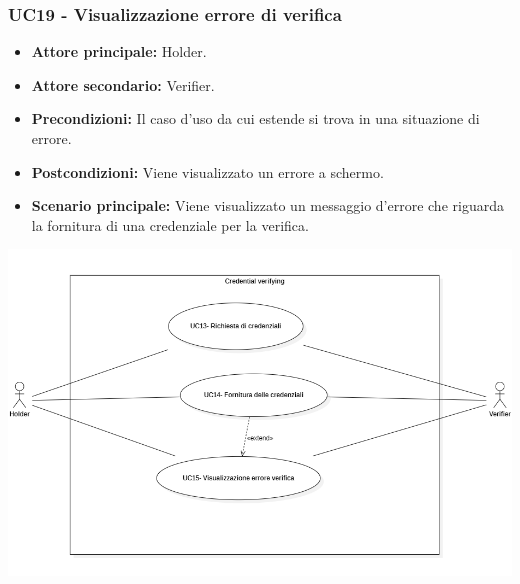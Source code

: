 \subsubsection{UC19 - Visualizzazione errore di verifica}
\begin{itemize}
    \item \textbf{Attore principale:} Holder.
    \item \textbf{Attore secondario:} Verifier.
    \item \textbf{Precondizioni:} Il caso d'uso da cui estende si trova in una situazione di errore.
    \item \textbf{Postcondizioni:} Viene visualizzato un errore a schermo. 
    \item \textbf{Scenario principale:} Viene visualizzato un messaggio d’errore che riguarda la fornitura di una credenziale per la verifica.
\end{itemize}

\begin{center}
    \includegraphics[scale = 0.65]{./res/img/UC4.PNG}
  \end{center}